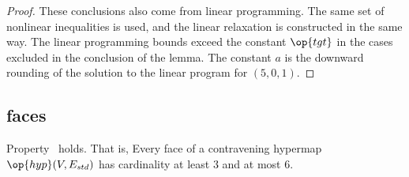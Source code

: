 \begin{proof} These conclusions also come from linear programming.
  The same set of nonlinear inequalities is used, and the linear
  relaxation is constructed in the same way.  The linear programming
  bounds exceed the constant $\op{tgt}$ in the cases excluded in the
  conclusion of the lemma.  The constant $a$ is the downward rounding
  of the solution to the linear program for $(5,0,1)$.
\end{proof}
%

%

\subsection{faces}



\begin{lemma}[]  \label{lemma:face-size}
  Property~ holds.  That is, Every face of a
  contravening hypermap $\op{hyp}(V,E_{std})$ has cardinality at least
  $3$ and at most $6$.
\end{lemma}

